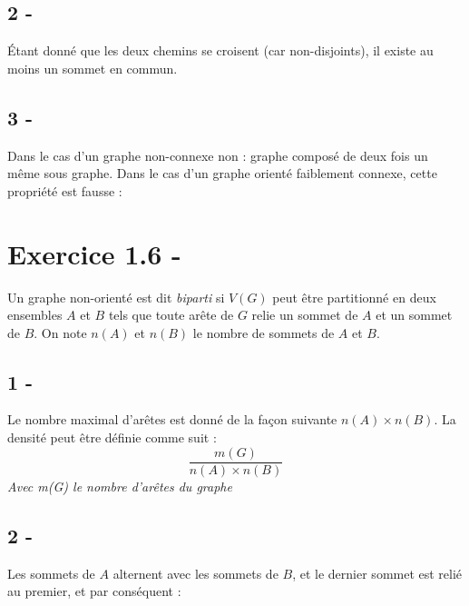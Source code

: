 \documentclass{article}
\begin{document}
    \subsection*{2 -}
        Étant donné que les deux chemins se croisent (car non-disjoints), il existe au moins un sommet en commun.
    \subsection*{3 -}
        Dans le cas d'un graphe non-connexe non : graphe composé de deux fois un même sous graphe.
        Dans le cas d'un graphe orienté faiblement connexe, cette propriété est fausse :
        \begin{center}
        \end{center}
    \section*{Exercice 1.6 -}
        Un graphe non-orienté est dit \textit{biparti} si $V(G)$ peut être partitionné en deux ensembles $A$ et $B$
        tels que toute arête de $G$ relie un sommet de $A$ et un sommet de $B$. On note $n(A)$ et $n(B)$ le nombre de sommets de $A$ et $B$.
        \subsection*{1 -}
            Le nombre maximal d'arêtes est donné de la façon suivante $n(A) \times n(B)$.
            La densité peut être définie comme suit :
            $$
            \frac{m(G)}{n(A)\times n(B)}
            $$
            \textit{Avec m(G) le nombre d'arêtes du graphe}
        \subsection*{2 -}
            Les sommets de $A$ alternent avec les sommets de $B$, et le dernier sommet est relié au premier, et par conséquent :
            
\end{document}
